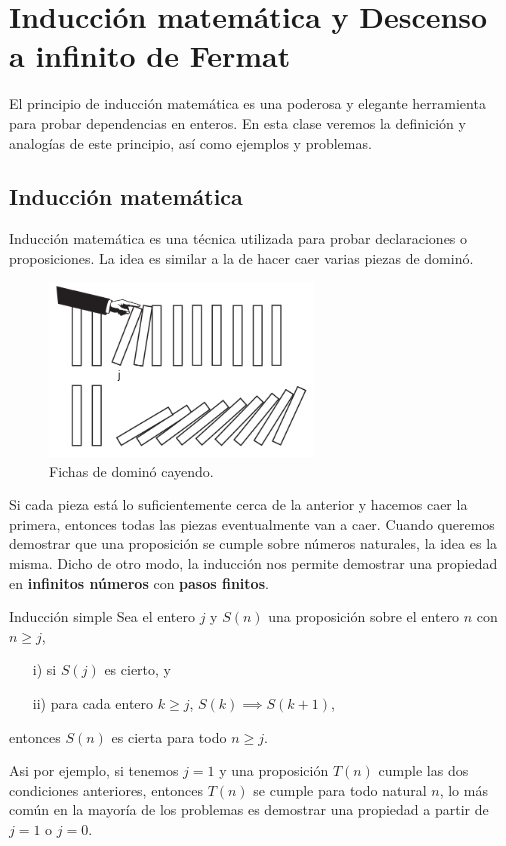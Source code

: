 \section{Inducción matemática y Descenso a infinito de Fermat}

El principio de inducción matemática es una poderosa y elegante herramienta para probar dependencias en enteros.
En esta clase veremos la definición y analogías de este principio, así como ejemplos y problemas.

\subsection{Inducción matemática}

Inducción matemática es una técnica utilizada para probar declaraciones o proposiciones.
La idea es similar a la de hacer caer varias piezas de dominó.
\begin{figure}[htb]
    \centering
    \includegraphics[width=7cm]{images/dominoes-fall}
    \caption{Fichas de dominó cayendo.}
    \label{fig:figure}
\end{figure}
Si cada pieza está lo suficientemente cerca de la anterior y hacemos caer la primera, entonces todas las piezas eventualmente van a caer.
Cuando queremos demostrar que una proposición se cumple sobre números naturales, la idea es la misma.
Dicho de otro modo, la inducción nos permite demostrar una propiedad en \textbf{infinitos números} con \textbf{pasos finitos}.

\begin{principle.box}{Inducción simple}{}
    Sea el entero $j$ y $S(n)$ una proposición sobre el entero $n$ con $n \geq j$,
    \begin{itemize}
        \item[i)] si $S(j)$ es cierto, y
        \item[ii)] para cada entero $k \geq j$, $S(k) \implies S(k + 1)$,
    \end{itemize}
    entonces $S(n)$ es cierta para todo $n \geq j$.
\end{principle.box}
Asi por ejemplo, si tenemos $j = 1$ y una proposición $T(n)$ cumple las dos condiciones anteriores,
entonces $T(n)$ se cumple para todo natural $n$, lo más común en la mayoría de los problemas es demostrar una propiedad
a partir de $j = 1$ o $j = 0$.

